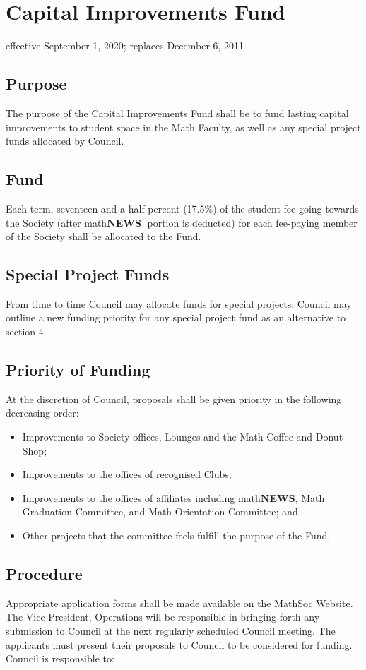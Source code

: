 \section{Capital Improvements Fund}
effective September 1, 2020; replaces December 6, 2011

\subsection{Purpose}
The purpose of the Capital Improvements Fund shall be to fund lasting capital improvements to student space in the Math Faculty, as well as any special project funds allocated by Council.

\subsection{Fund}
Each term, seventeen and a half percent (17.5\%) of the student fee going towards the 
Society (after math\textbf{\textsf{NEWS}}' portion is deducted) for each fee-paying member of the 
Society shall be allocated to the Fund.

\subsection{Special Project Funds}
From time to time Council may allocate funds for special projects. Council may outline a new funding priority for any special project fund as an alternative to section 4.

\subsection{Priority of Funding}
At the discretion of Council, proposals shall be given priority in the following decreasing order:\
\begin{itemize}
\item Improvements to Society offices, Lounges and the Math Coffee and Donut Shop;
\item Improvements to the offices of recognised Clubs;
\item Improvements to the offices of affiliates including math\textbf{\textsf{NEWS}}, Math Graduation Committee, and Math Orientation Committee; and
\item Other projects that the committee feels fulfill the purpose of the Fund.
\end{itemize}

\subsection{Procedure}
Appropriate application forms shall be made available on the MathSoc Website. The Vice
President, Operations will be responsible in bringing forth any submission to Council 
at the next regularly scheduled Council meeting. The applicants must present their 
proposals to Council to be considered for funding. Council is responsible to:

